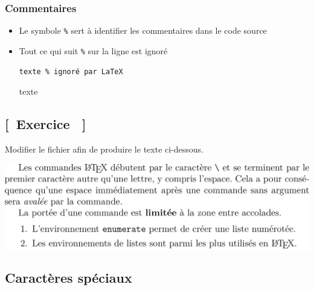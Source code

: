 \begin{frame}[fragile=singleslide]
  \frametitle{Commentaires}
  \begin{itemize}
  \item Le symbole \verb=%= sert à identifier les commentaires dans
    le code source
  \item Tout ce qui suit \verb=%= sur la ligne est ignoré
    \begin{demo}
      \begin{texample}
\begin{lstlisting}
texte % ignoré par LaTeX
\end{lstlisting}
        \producing
        texte %
      \end{texample}
    \end{demo}
  \end{itemize}
\end{frame}

\subsection{[~Exercice \theexerciceref~]}

\begin{frame}[plain,fragile=singleslide]
  \begin{exercice}
    Modifier le fichier  afin de
    produire le texte ci-dessous.
  \end{exercice}
  \begin{center}
    \colorbox{white}{\includegraphics[width=0.95\linewidth]{exercice_commandes-output}}
  \end{center}
\end{frame}

\subsection{Caractères spéciaux}

